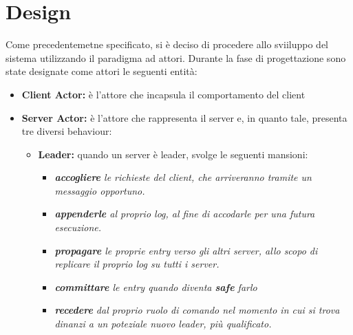 \section{Design}

Come precedentemetne specificato, si è deciso di procedere allo sviiluppo del sistema utilizzando il paradigma ad attori. Durante la fase di progettazione sono state designate come attori le seguenti entità:

\begin{itemize}
	\item{\textbf{Client Actor:}} è l'attore che incapsula il comportamento del client 
	\item{\textbf{Server Actor:}} è l'attore che rappresenta il server e, in quanto tale, presenta tre diversi behaviour:
		\begin{itemize}
		 	\item{\textbf{Leader:}} quando un server è leader, svolge le seguenti mansioni:
		 		\begin{itemize}
					\item \emph{\textbf{accogliere} le richieste del client, che arriveranno tramite un messaggio opportuno.}
					\item \emph{\textbf{appenderle} al proprio log, al fine di accodarle per una futura esecuzione.}
					\item \emph{\textbf{propagare} le proprie entry verso gli altri server, allo scopo di replicare il proprio log su tutti i server.} 
					\item \emph{\textbf{committare} le entry quando diventa \textbf{safe} farlo}  
					\item \emph{\textbf{recedere} dal proprio ruolo di comando nel momento in cui si trova dinanzi a un poteziale nuovo leader, più qualificato.}
				\end{itemize}


\end{itemize}
\end{itemize}

